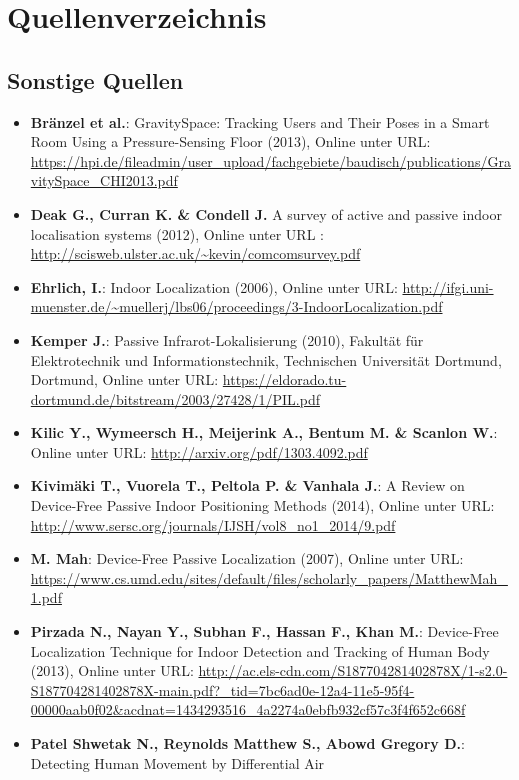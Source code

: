 \newpage

\section{Quellenverzeichnis}
\subsection*{Sonstige Quellen}
\begin{itemize}[leftmargin=*]
\item[] \textbf{Bränzel et al.}: GravitySpace: Tracking Users and Their Poses in a Smart Room Using a Pressure-Sensing Floor (2013), Online unter URL: \url{https://hpi.de/fileadmin/user_upload/fachgebiete/baudisch/publications/GravitySpace_CHI2013.pdf}
\item[] \textbf{Deak G., Curran K. \& Condell J.} A survey of active and passive indoor localisation systems (2012), Online unter URL : \url{http://scisweb.ulster.ac.uk/~kevin/comcomsurvey.pdf}
\item[] \textbf{Ehrlich, I.}: Indoor Localization (2006), Online unter URL: \url{http://ifgi.uni-muenster.de/~muellerj/lbs06/proceedings/3-IndoorLocalization.pdf}
\item[] \textbf{Kemper J.}: Passive Infrarot-Lokalisierung (2010), Fakultät für Elektrotechnik und Informationstechnik, Technischen Universität Dortmund, Dortmund, Online unter URL: \url{https://eldorado.tu-dortmund.de/bitstream/2003/27428/1/PIL.pdf}
\item[] \textbf{Kilic Y., Wymeersch H., Meijerink A., Bentum M. \& Scanlon W.}: Online unter URL: \url{http://arxiv.org/pdf/1303.4092.pdf}
\item[] \textbf{Kivimäki T., Vuorela T., Peltola P. \& Vanhala J.}: A Review on Device-Free Passive Indoor Positioning Methods (2014), Online unter URL: \url{http://www.sersc.org/journals/IJSH/vol8_no1_2014/9.pdf}
\item[] \textbf{M. Mah}: Device-Free Passive Localization (2007), Online unter URL: \url{https://www.cs.umd.edu/sites/default/files/scholarly_papers/MatthewMah_1.pdf}
\item[] \textbf{Pirzada N., Nayan Y., Subhan F., Hassan F., Khan M.}: Device-Free Localization Technique for Indoor Detection and Tracking of Human Body (2013), Online unter URL: \url{http://ac.els-cdn.com/S187704281402878X/1-s2.0-S187704281402878X-main.pdf?_tid=7bc6ad0e-12a4-11e5-95f4-00000aab0f02&acdnat=1434293516_4a2274a0ebfb932cf57c3f4f652c668f}
\item[] \textbf{Patel Shwetak N., Reynolds Matthew S., Abowd Gregory D.}: Detecting Human Movement by Differential Air

\end{itemize}

